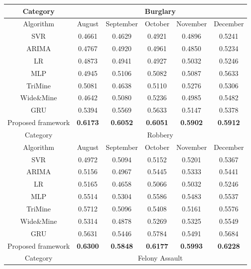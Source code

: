 \begin{table}
    \centering
    \footnotesize
    \begin{tabular}{c|c|c|c|c|c}
        \toprule
        Category &\multicolumn{5}{|c}{Burglary}\\[0.1cm]
        \hline
        Algorithm & August & September & October & November & December \\[0.1cm]
        \hline
        SVR & 0.4661 & 0.4629 & 0.4921 & 0.4896 & 0.5241\\[0.1cm]
        ARIMA & 0.4767 & 0.4920 & 0.4961 & 0.4850 & 0.5234\\[0.1cm]
        LR & 0.4873 & 0.4941 & 0.4927 & 0.5032 & 0.5246\\[0.1cm]
        MLP & 0.4945 & 0.5106 & 0.5082 & 0.5087 & 0.5633\\[0.1cm]
        TriMine & 0.5081 & 0.4638 & 0.5110 & 0.5276 & 0.5306\\[0.1cm]
        Wide\&Mine & 0.4642 & 0.5080 & 0.5236 & 0.4985 & 0.5482\\[0.1cm]
        GRU & 0.5394 & 0.5569 & 0.5633 & 0.5147 & 0.5378\\[0.1cm]
        \toprule
        Proposed framework & \bf 0.6173 & \bf 0.6052 & \bf 0.6051 & \bf 0.5902 & \bf 0.5912\\
        \bottomrule
        \toprule
        Category &\multicolumn{5}{|c}{Robbery}\\[0.1cm]
        \hline
        Algorithm & August & September & October & November & December \\[0.1cm]
        \hline
        SVR & 0.4972 & 0.5094 & 0.5152 & 0.5201 & 0.5367\\[0.1cm]
        ARIMA & 0.5156 & 0.4967 & 0.5445 & 0.5333 & 0.5441\\[0.1cm]
        LR & 0.5165 & 0.4658 & 0.5066 & 0.5032 & 0.5246\\[0.1cm]
        MLP & 0.5514 & 0.5304 & 0.5586 & 0.5483 & 0.5537\\[0.1cm]
        TriMine & 0.5712 & 0.5096 & 0.5408 & 0.5161 & 0.5576\\[0.1cm]
        Wide\&Mine & 0.5314 & 0.4878 & 0.5269 & 0.5325 & 0.5549\\[0.1cm]
        GRU & 0.5631 & 0.5446 & 0.5784 & 0.5491 & 0.5684 \\[0.1cm]
        \toprule
        Proposed framework & \bf 0.6300 & \bf 0.5848 & \bf 0.6177 & \bf 0.5993 & \bf 0.6228\\
        \bottomrule
        \toprule
        Category &\multicolumn{5}{|c}{Felony Assault}\\[0.1cm]

\end{tabular}
\end{table}
